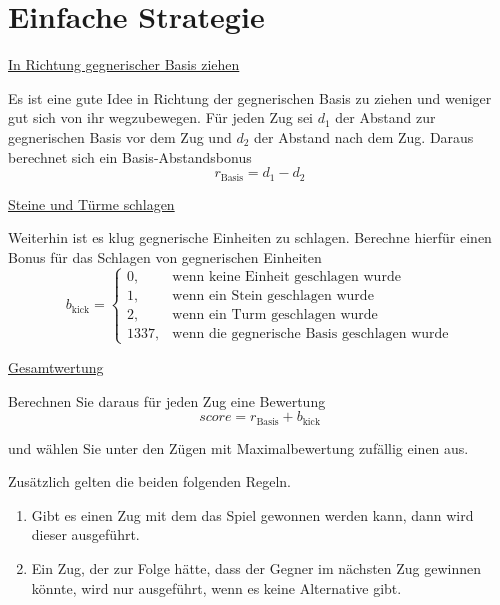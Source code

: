 \hypertarget{strategy}{\section*{Einfache Strategie}}
\underline{In Richtung gegnerischer Basis ziehen}

Es ist eine gute Idee in Richtung der gegnerischen Basis zu ziehen und weniger gut sich von ihr wegzubewegen. Für jeden Zug sei $d_1$ der Abstand zur gegnerischen Basis vor dem Zug und $d_2$ der Abstand nach dem Zug. Daraus berechnet sich ein Basis-Abstandsbonus \[r_\text{Basis} = d_1 - d_2\]

\underline{Steine und Türme schlagen}

Weiterhin ist es klug gegnerische Einheiten zu schlagen. Berechne hierfür einen Bonus für das Schlagen von gegnerischen Einheiten \[b_\text{kick} = \begin{cases}
0, & \text{wenn keine Einheit geschlagen wurde} \\
1, & \text{wenn ein Stein geschlagen wurde} \\
2, & \text{wenn ein Turm geschlagen wurde} \\
1337, & \text{wenn die gegnerische Basis geschlagen wurde}
\end{cases}\]

\underline{Gesamtwertung}

Berechnen Sie daraus für jeden Zug eine Bewertung
\[score = r_\text{Basis} + b_\text{kick}\]

und wählen Sie unter den Zügen mit Maximalbewertung zufällig einen aus.

\bigskip

Zusätzlich gelten die beiden folgenden Regeln.
\begin{enumerate}[label=\alph*)]
\item Gibt es einen Zug mit dem das Spiel gewonnen werden kann, dann wird dieser ausgeführt.
\item Ein Zug, der zur Folge hätte, dass der Gegner im nächsten Zug gewinnen könnte, wird nur ausgeführt, wenn es keine Alternative gibt.
\end{enumerate}